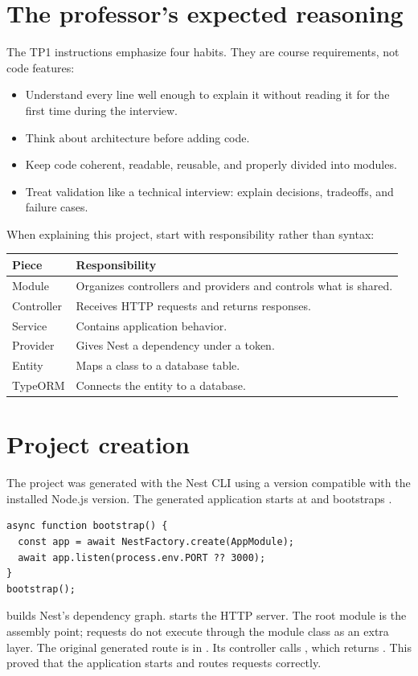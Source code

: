 \newpage
\section{The professor's expected reasoning}
The TP1 instructions emphasize four habits. They are course requirements, not code features:
\begin{itemize}
\item Understand every line well enough to explain it without reading it for the first time during the interview.
\item Think about architecture before adding code.
\item Keep code coherent, readable, reusable, and properly divided into modules.
\item Treat validation like a technical interview: explain decisions, tradeoffs, and failure cases.
\end{itemize}
When explaining this project, start with responsibility rather than syntax:
\begin{tabularx}{\linewidth}{@{}lX@{}}\toprule
\textbf{Piece} & \textbf{Responsibility}\\\midrule
Module & Organizes controllers and providers and controls what is shared.\\
Controller & Receives HTTP requests and returns responses.\\
Service & Contains application behavior.\\
Provider & Gives Nest a dependency under a token.\\
Entity & Maps a class to a database table.\\
TypeORM & Connects the entity to a database.\\\bottomrule
\end{tabularx}

\section{Project creation}
The project was generated with the Nest CLI using a version compatible with the installed Node.js version. The generated application starts at  and bootstraps .
\begin{lstlisting}
async function bootstrap() {
  const app = await NestFactory.create(AppModule);
  await app.listen(process.env.PORT ?? 3000);
}
bootstrap();
\end{lstlisting}
 builds Nest's dependency graph.  starts the HTTP server. The root module is the assembly point; requests do not execute through the module class as an extra layer.
The original generated route is in . Its controller calls , which returns . This proved that the application starts and routes requests correctly.

